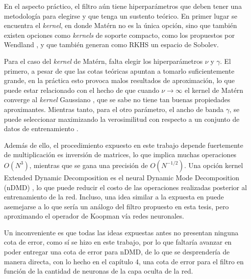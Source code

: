 En el aspecto práctico, el filtro aún tiene hiperparámetros que deben tener una metodología para elegirse y que tenga un sustento teórico. En primer lugar se encuentra el \textit{kernel}, en donde Matérn no es la única opción, sino que también existen opciones como \textit{kernels} de soporte compacto, como los propuestos por Wendland \cite{Wendland1995PiecewiseDegree}, y que también generan como RKHS un espacio de Sobolev.

Para el caso del \textit{kernel} de Matérn, falta elegir los hiperparámetros $\nu$ y $\gamma$. El primero, a pesar de que las cotas teóricas apuntan a tomarlo suficientemente grande, en la práctica esto provoca malos resultados de aproximación, lo que puede estar relacionado con el hecho de que cuando $\nu \to \infty$ el kernel de Matérn converge al \textit{kernel} Gaussiano \cite{Rasmussen2005GaussianLearning}, que se sabe no tiene tan buenas propiedades aproximantes. Mientras tanto, para el otro parámetro, el ancho de banda $\gamma$, se puede seleccionar maximizando la verosimilitud con respecto a un conjunto de datos de entrenamiento \cite{Rasmussen2005GaussianLearning}.

Además de ello, el procedimiento expuesto en este trabajo depende fuertemente de multiplicación es inversión de matrices, lo que implica muchas operaciones $O(N^3)$, mientras que se gana una precisión de $O(N^{-1/2})$. Una opción kernel Extended Dynamic Decomposition es el neural Dynamic Mode Decomposition (nDMD) \cite{Xiong2024KoopmanEquations, Frion2023LeveragingData, Terao2021ExtendedEquations}, lo que puede reducir el costo de las operaciones realizadas posterior al entrenamiento de la red. Incluso, una idea similar a la expuesta en \cite{Li2022Data-DrivenNetworks, Liu2024NeuralSystems, Garmaev2024DeepModelling} puede asemejarse a lo que sería un análogo del filtro propuesto en esta tesis, pero aproximando el operador de Koopman vía redes neuronales. 

Un inconveniente es que todas las ideas expuestas antes no presentan ninguna cota de error, como sí se hizo en este trabajo, por lo que faltaría avanzar en poder entregar una cota de error para nDMD, de lo que se desprendería de manera directa, con lo hecho en el capítulo 4, una cota de error para el filtro en función de la cantidad de neuronas de la capa oculta de la red.